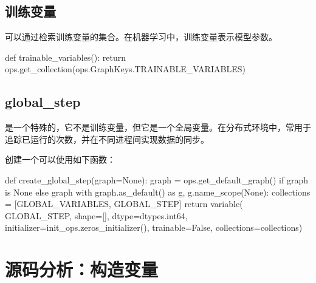 \begin{content}
\subsection{训练变量}

可以通过检索训练变量的集合。在机器学习中，训练变量表示模型参数。

\begin{leftbar}
\begin{python}
def trainable_variables():
  return ops.get_collection(ops.GraphKeys.TRAINABLE_VARIABLES)
\end{python}
\end{leftbar}

\subsection{global\_step}

是一个特殊的，它不是训练变量，但它是一个全局变量。在分布式环境中，常用于追踪已运行的次数，并在不同进程间实现数据的同步。

创建一个可以使用如下函数：

\begin{leftbar}
\begin{python}
def create_global_step(graph=None):
  graph = ops.get_default_graph() if graph is None else graph
  with graph.as_default() as g, g.name_scope(None):
    collections = [GLOBAL_VARIABLES, GLOBAL_STEP]
    return variable(
        GLOBAL_STEP,
        shape=[],
        dtype=dtypes.int64,
        initializer=init_ops.zeros_initializer(),
        trainable=False,
        collections=collections)
\end{python}
\end{leftbar}

\end{content}

\section{源码分析：构造变量}

